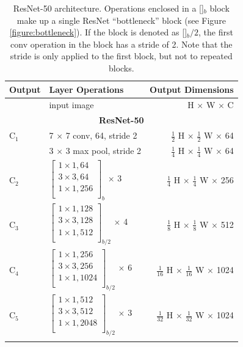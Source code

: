 {
\begin{longtable}{llr}
\toprule
\textbf{Output} & \textbf{Layer Operations} & \textbf{Output Dimensions} \\
\midrule\midrule
 & input image & H $\times$ W $\times$ C \\
\midrule
\multicolumn{3}{c}{\textbf{ResNet-50}}\\
\midrule
C$_1$ & 7 $\times$ 7 conv, 64, stride 2 & $\tfrac{1}{2}$ H $\times$ $\tfrac{1}{2}$ W $\times$ 64 \\

& 3 $\times$ 3 max pool, stride 2 & $\tfrac{1}{4}$ H $\times$ $\tfrac{1}{4}$ W $\times$ 64 \\

C$_2$ &
$\begin{bmatrix}
1 \times 1, 64 \\
3 \times 3, 64 \\
1 \times 1, 256 \\
\end{bmatrix}_b$ $\times$ 3
& $\tfrac{1}{4}$ H $\times$ $\tfrac{1}{4}$ W $\times$ 256 \\
\midrule
C$_3$ &
$\begin{bmatrix}
1 \times 1, 128 \\
3 \times 3, 128 \\
1 \times 1, 512 \\
\end{bmatrix}_{b/2}$ $\times$ 4
& $\tfrac{1}{8}$ H $\times$ $\tfrac{1}{8}$ W $\times$ 512 \\
\midrule
C$_4$ &
$\begin{bmatrix}
1 \times 1, 256 \\
3 \times 3, 256 \\
1 \times 1, 1024 \\
\end{bmatrix}_{b/2}$ $\times$ 6
& $\tfrac{1}{16}$ H $\times$ $\tfrac{1}{16}$ W $\times$ 1024 \\
\midrule
C$_5$ &
$\begin{bmatrix}
1 \times 1, 512 \\
3 \times 3, 512 \\
1 \times 1, 2048 \\
\end{bmatrix}_{b/2}$ $\times$ 3
& $\tfrac{1}{32}$ H $\times$ $\tfrac{1}{32}$ W $\times$ 1024 \\

\bottomrule

\caption {
ResNet-50 \cite{ResNet} architecture.
Operations enclosed in a []$_b$ block make up a single ResNet \enquote{bottleneck}
block (see Figure \ref{figure:bottleneck}). If the block is denoted as []$_b/2$,
the first conv operation in the block has a stride of 2. Note that the stride
is only applied to the first block, but not to repeated blocks.
}
\label{table:resnet}
\end{longtable}


}

